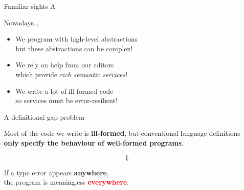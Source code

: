 
\begin{frame}[fragile]{Familiar sights}
  A
\end{frame}

\begin{frame}{Nowadays\ldots}
  \begin{itemize}
    \item We program with high-level abstractions \\ \pause
      but these abstractions can be complex!

      \pause
    \item We rely on help from our editors \\ \pause
      which provide \emph{rich semantic services}!

      \pause
    \item We write a lot of ill-formed code \\ \pause
      so services must be error-resilient!
  \end{itemize}
\end{frame}

\begin{frame}{A definitional gap problem}
  \begin{center}
    Most of the code we write is \textcolor{RedOrange}{\textbf{ill-formed}}\pause,
    but conventional language definitions
    \textcolor{RedOrange}{\textbf{only specify the behaviour of well-formed programs}}.
  \end{center}
  \pause
  \[%
    \bm{\Downarrow}
  \]%

  \begin{center}
    If a type error appears \textcolor{RedOrange}{\textbf{anywhere}},\\
    the program is meaningless \textcolor{Red}{\textbf{everywhere}}.
  \end{center}
\end{frame}

